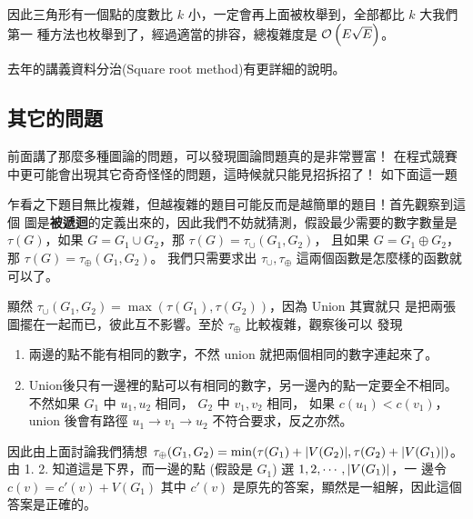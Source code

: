 \documentclass[a4paper,12pt]{book}
\begin{document}
因此三角形有一個點的度數比 $k$ 小，一定會再上面被枚舉到，全部都比 $k$ 大我們第一
種方法也枚舉到了，經過適當的排容，總複雜度是 $\operatorname{\mathcal{O}}\left(E \sqrt{E}\right)$。

去年的講義資料分治(Square root method)有更詳細的說明。

\subsection{其它的問題}
前面講了那麼多種圖論的問題，可以發現圖論問題真的是非常豐富！
在程式競賽中更可能會出現其它奇奇怪怪的問題，這時候就只能見招拆招了！
如下面這一題


乍看之下題目無比複雜，但越複雜的題目可能反而是越簡單的題目！首先觀察到這個
圖是{\bf 被遞迴}的定義出來的，因此我們不妨就猜測，假設最少需要的數字數量是
$\tau(G)$，如果 $G = G_1 \cup G_2$，那 $\tau(G) = \tau_\cup(G_1, G_2)$，
且如果 $G = G_1 \oplus G_2$，那 $\tau(G) = \tau_\oplus(G_1, G_2)$。
我們只需要求出 $\tau_\cup, \tau_\oplus$ 這兩個函數是怎麼樣的函數就可以了。

顯然 $\tau_\cup(G_1, G_2) = \max(\tau(G_1), \tau(G_2))$，因為 Union 其實就只
是把兩張圖擺在一起而已，彼此互不影響。至於 $\tau_\oplus$ 比較複雜，觀察後可以
發現
\begin{enumerate}
  \item  兩邊的點不能有相同的數字，不然 union 就把兩個相同的數字連起來了。
  \item  Union後只有一邊裡的點可以有相同的數字，另一邊內的點一定要全不相同。
          不然如果 $G_1$ 中 $u_1, u_2$ 相同， $G_2$ 中 $v_1, v_2$ 相同，
          如果 $c(u_1) < c(v_1)$，union 後會有路徑
        $u_1 \to v_1 \to u_2$ 不符合要求，反之亦然。
\end{enumerate}
因此由上面討論我們猜想 $\tau_\oplus(G_1, G_2) = \min(\tau(G_1)+\lvert V(G_2) \rvert, 
\tau(G_2)+\lvert V(G_1) \rvert)$。
由 1. 2. 知道這是下界，而一邊的點 (假設是 $G_1$) 選 $1, 2, \cdots, \lvert V(G_1) \rvert$，一
邊令 $c(v) = c'(v) + V(G_1)$ 其中 $c'(v)$ 是原先的答案，顯然是一組解，因此這個答案是正確的。
\end{document}

